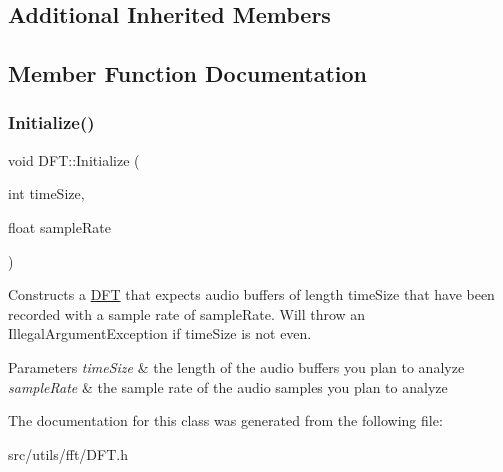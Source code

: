 \subsection*{Additional Inherited Members}


\subsection{Member Function Documentation}
\mbox{\label{class_d_f_t_a6d875398a127f4ba5d21cb0ad9ef370b}} 
\subsubsection{\texorpdfstring{Initialize()}{Initialize()}}
{\footnotesize\ttfamily void D\+F\+T\+::\+Initialize (\begin{DoxyParamCaption}\item[{int}]{time\+Size,  }\item[{float}]{sample\+Rate }\end{DoxyParamCaption})\hspace{0.3cm}{\ttfamily [inline]}}

Constructs a \hyperlink{class_d_f_t}{D\+FT} that expects audio buffers of length {\ttfamily time\+Size} that have been recorded with a sample rate of {\ttfamily sample\+Rate}. Will throw an Illegal\+Argument\+Exception if {\ttfamily time\+Size} is not even.


\begin{DoxyParams}{Parameters}
{\em time\+Size} & the length of the audio buffers you plan to analyze \\
\hline
{\em sample\+Rate} & the sample rate of the audio samples you plan to analyze \\
\hline
\end{DoxyParams}


The documentation for this class was generated from the following file\+:\begin{DoxyCompactItemize}
\item 
src/utils/fft/D\+F\+T.\+h\end{DoxyCompactItemize}
